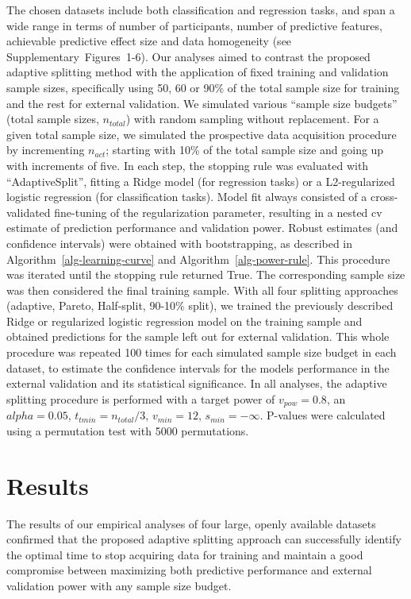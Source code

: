 \documentclass{article}
\begin{document}
The chosen datasets include both classification and regression tasks, and span a wide range in terms of number of participants, number of predictive features, achievable predictive effect size and data homogeneity (see Supplementary~Figures~1-6).
Our analyses aimed to contrast the proposed adaptive splitting method with the application of fixed training and validation sample sizes, specifically using 50, 60 or 90\% of the total sample size for training and the rest for external validation.
We simulated various ``sample size budgets'' (total sample sizes, $n_{total}$) with random sampling without replacement.
For a given total sample size, we simulated the prospective data acquisition procedure by incrementing $n_{act}$; starting with 10\% of the total sample size and going up with increments of five.
In each step, the stopping rule was evaluated with ``AdaptiveSplit'', fitting a Ridge model (for regression tasks) or a L2-regularized logistic regression (for classification tasks). Model fit always consisted of a cross-validated fine-tuning of the regularization parameter, resulting in a nested \acrshort{cv} estimate of prediction performance and validation power. Robust estimates (and confidence intervals) were obtained with bootstrapping, as described in Algorithm~\ref{alg-learning-curve} and Algorithm~\ref{alg-power-rule}.
This procedure was iterated until the stopping rule returned True. The corresponding sample size was then considered the final training sample.
With all four splitting approaches (adaptive, Pareto, Half-split, 90-10\% split), we trained the previously described Ridge or regularized logistic regression model on the training sample and obtained predictions for the sample left out for external validation.
This whole procedure was repeated 100 times for each simulated sample size budget in each dataset, to estimate the confidence intervals for the models performance in the external validation and its statistical significance.
In all analyses, the adaptive splitting procedure is performed with a target power of $v_{pow} = 0.8$, an $alpha = 0.05$,  $t_{tmin} = n_{total}/3$, $v_{min}=12$, $s_{min}= -\infty$.  P-values were calculated using a permutation test with 5000 permutations.

\section{Results}

The results of our empirical analyses of four large, openly available datasets confirmed that the proposed adaptive splitting approach can successfully identify the optimal time to stop acquiring data for training and maintain a good compromise between maximizing both predictive performance and external validation power with any sample size budget.
\end{document}
